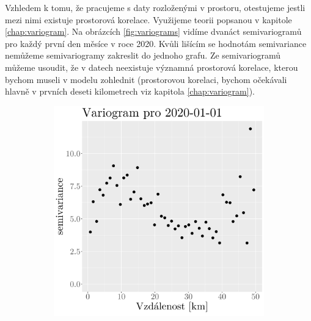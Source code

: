 Vzhledem k tomu, že pracujeme s daty rozloženými v prostoru, otestujeme jestli mezi nimi existuje prostorová korelace. Využijeme teorii popsanou v kapitole \ref{chap:variogram}. Na obrázcích \ref{fig:variograms} vidíme dvanáct semivariogramů pro každý první den měsíce v roce 2020. Kvůli lišícím se hodnotám semivariance nemůžeme semivariogramy zakreslit do jednoho grafu. Ze semivariogramů můžeme usoudit, že v datech neexistuje významná prostorová korelace, kterou bychom museli v modelu zohlednit (prostorovou korelaci, bychom očekávali hlavně v prvních deseti kilometrech viz kapitola \ref{chap:variogram}).

\begin{figure}
	\centering
	\begin{subfigure}{0.30\textwidth}
		\includegraphics[width=\textwidth]{img/ch2/variograms/variogram_max15cm1.png}
		\caption{}
		\label{fig:variogram1}
	\end{subfigure}
	\hfill
	\begin{subfigure}{0.30\textwidth}

\end{subfigure}
\end{figure}
